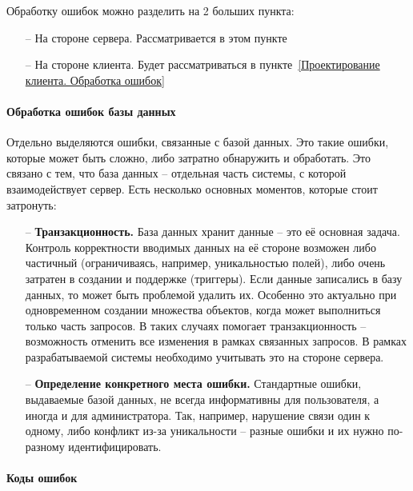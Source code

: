 \documentclass[a4paper,article]{article}
\begin{document}
    Обработку ошибок можно разделить на 2 больших пункта:

    \begin{itemize}[nolistsep]
        \item[--] На стороне сервера. Рассматривается в этом пункте
        \item[--] На стороне клиента. Будет рассматриваться в пункте~\ref{Проектирование клиента. Обработка ошибок}
    \end{itemize}

    \paragraph{Обработка ошибок базы данных}

    Отдельно выделяются ошибки, связанные с базой данных. Это такие ошибки, которые может быть сложно, либо затратно обнаружить и обработать. Это связано с тем, что база данных -- отдельная часть системы, с которой взаимодействует сервер. Есть несколько основных моментов, которые стоит затронуть:

    \begin{itemize}[nolistsep]
        \item[--] \textbf{Транзакционность.} База данных хранит данные -- это её основная задача. Контроль корректности вводимых данных на её стороне возможен либо частичный (ограничиваясь, например, уникальностью полей), либо очень затратен в создании и поддержке (триггеры). Если данные записались в базу данных, то может быть проблемой удалить их. Особенно это актуально при одновременном создании множества объектов, когда может выполниться только часть запросов. В таких случаях помогает транзакционность -- возможность отменить все изменения в рамках связанных запросов. В рамках разрабатываемой системы необходимо учитывать это на стороне сервера.
        \item[--] \textbf{Определение конкретного места ошибки.} Стандартные ошибки, выдаваемые базой данных, не всегда информативны для пользователя, а иногда и для администратора. Так, например, нарушение связи один к одному, либо конфликт из-за уникальности -- разные ошибки и их нужно по-разному идентифицировать.
    \end{itemize}

    \paragraph{Коды ошибок}\label{Проектирование сервера. Коды ошибок}
\end{document}
